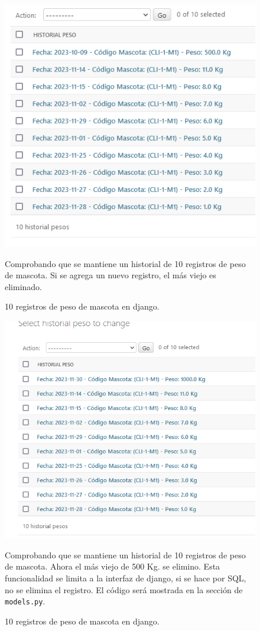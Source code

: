 \documentclass[
  12pt,
  hidelinks,
  a4paper,
  headings=standardclasses,
  headings=big,
  spanish
]{scrartcl}
\begin{document}
\begin{figure}[H]
  \centering
  \includegraphics[width=\textwidth]{django-peso-1.png}
  \caption{10 registros de peso de mascota en django.}
  \medskip
  \small
  Comprobando que se mantiene un historial de 10 registros de peso de mascota.
  Si se agrega un nuevo registro, el más viejo es eliminado.
\end{figure}

\begin{figure}[H]
  \centering
  \includegraphics[width=\textwidth]{django-peso-2.png}
  \caption{10 registros de peso de mascota en django.}
  \medskip
  \small
  Comprobando que se mantiene un historial de 10 registros de peso de mascota.
  Ahora el más viejo de 500 Kg. se elimino. Esta funcionalidad se limita a la interfaz de django, si se hace por SQL, no se elimina el registro. El código será mostrada en la sección de \texttt{models.py}.
\end{figure}
\end{document}
